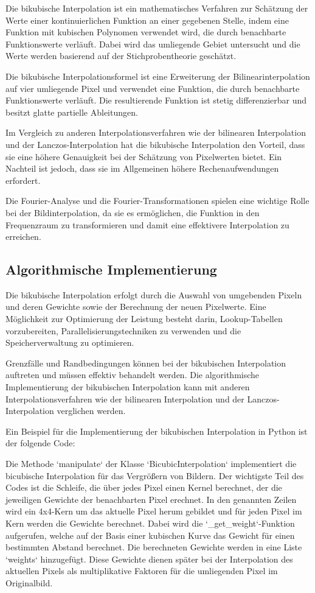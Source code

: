 Die bikubische Interpolation ist ein mathematisches Verfahren zur Schätzung der Werte einer kontinuierlichen Funktion an einer gegebenen Stelle, indem eine Funktion mit kubischen Polynomen verwendet wird, die durch benachbarte Funktionswerte verläuft. Dabei wird das umliegende Gebiet untersucht und die Werte werden basierend auf der Stichprobentheorie geschätzt.

Die bikubische Interpolationsformel ist eine Erweiterung der Bilinearinterpolation auf vier umliegende Pixel und verwendet eine Funktion, die durch benachbarte Funktionswerte verläuft. Die resultierende Funktion ist stetig differenzierbar und besitzt glatte partielle Ableitungen.

Im Vergleich zu anderen Interpolationsverfahren wie der bilinearen Interpolation und der Lanczos-Interpolation hat die bikubische Interpolation den Vorteil, dass sie eine höhere Genauigkeit bei der Schätzung von Pixelwerten bietet. Ein Nachteil ist jedoch, dass sie im Allgemeinen höhere Rechenaufwendungen erfordert.

Die Fourier-Analyse und die Fourier-Transformationen spielen eine wichtige Rolle bei der Bildinterpolation, da sie es ermöglichen, die Funktion in den Frequenzraum zu transformieren und damit eine effektivere Interpolation zu erreichen.

\subsection{Algorithmische Implementierung}

Die bikubische Interpolation erfolgt durch die Auswahl von umgebenden Pixeln und deren Gewichte sowie der Berechnung der neuen Pixelwerte. Eine Möglichkeit zur Optimierung der Leistung besteht darin, Lookup-Tabellen vorzubereiten, Parallelisierungstechniken zu verwenden und die Speicherverwaltung zu optimieren.

Grenzfälle und Randbedingungen können bei der bikubischen Interpolation auftreten und müssen effektiv behandelt werden. Die algorithmische Implementierung der bikubischen Interpolation kann mit anderen Interpolationsverfahren wie der bilinearen Interpolation und der Lanczos-Interpolation verglichen werden.

Ein Beispiel für die Implementierung der bikubischen Interpolation in Python ist der folgende Code:

Die Methode `manipulate` der Klasse `BicubicInterpolation` implementiert die bicubische Interpolation für das Vergrößern von Bildern. Der wichtigste Teil des Codes ist die Schleife, die über jedes Pixel einen Kernel berechnet, der die jeweiligen Gewichte der benachbarten Pixel erechnet. In den genannten Zeilen wird ein 4x4-Kern um das aktuelle Pixel herum gebildet und für jeden Pixel im Kern werden die Gewichte berechnet. Dabei wird die `_get_weight`-Funktion aufgerufen, welche auf der Basis einer kubischen Kurve das Gewicht für einen bestimmten Abstand berechnet. Die berechneten Gewichte werden in eine Liste `weights` hinzugefügt. Diese Gewichte dienen später bei der Interpolation des aktuellen Pixels als multiplikative Faktoren für die umliegenden Pixel im Originalbild.

